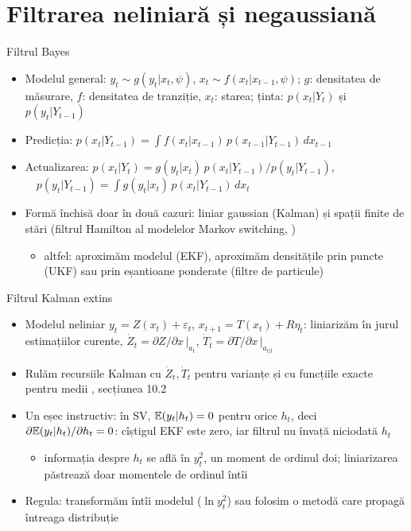 \section{Filtrarea neliniară și negaussiană}

\begin{frame}{Filtrul Bayes}
\itemsize{\small}
\begin{itemize}
    \item Modelul general: $y_t \sim g(y_t | x_t, \psi)$, $x_t \sim f(x_t | x_{t-1}, \psi)$; $g$: densitatea de măsurare, $f$: densitatea de tranziție, $x_t$: starea; ținta: $p(x_t | Y_t)$ și $p(y_t | Y_{t-1})$
    \item Predicția: $p(x_t | Y_{t-1}) = \int f(x_t | x_{t-1})\,p(x_{t-1} | Y_{t-1})\,dx_{t-1}$
    \item Actualizarea: $p(x_t | Y_t) = g(y_t | x_t)\,p(x_t | Y_{t-1}) / p(y_t | Y_{t-1})$, $\quad p(y_t | Y_{t-1}) = \int g(y_t | x_t)\,p(x_t | Y_{t-1})\,dx_t$
    \item Formă închisă doar în două cazuri: liniar gaussian (Kalman) și spații finite de stări (filtrul Hamilton al modelelor Markov switching, )
    \begin{itemize}
        \item altfel: aproximăm modelul (EKF), aproximăm densitățile prin puncte (UKF) sau prin eșantioane ponderate (filtre de particule)
    \end{itemize}
\end{itemize}
\end{frame}

\begin{frame}{Filtrul Kalman extins}
\itemsize{\small}
\begin{itemize}
    \item Modelul neliniar $y_t = Z(x_t) + \varepsilon_t$, $x_{t+1} = T(x_t) + R\eta_t$: liniarizăm în jurul estimațiilor curente, $\dot Z_t = \partial Z/\partial x\,|_{a_t}$, $\dot T_t = \partial T/\partial x\,|_{a_{t|t}}$
    \item Rulăm recursiile Kalman cu $\dot Z_t, \dot T_t$ pentru varianțe și cu funcțiile exacte pentru medii , secțiunea 10.2
    \item Un eșec instructiv: în SV, $\mathbb{E}(y_t | h_t) = 0$ pentru orice $h_t$, deci $\partial\mathbb{E}(y_t | h_t)/\partial h_t = 0$: cîștigul EKF este zero, iar filtrul nu învață niciodată $h_t$
    \begin{itemize}
        \item informația despre $h_t$ se află în $y^2_t$, un moment de ordinul doi; liniarizarea păstrează doar momentele de ordinul întîi
    \end{itemize}
    \item Regula: transformăm întîi modelul ($\ln y^2_t$) sau folosim o metodă care propagă întreaga distribuție
\end{itemize}
\end{frame}

